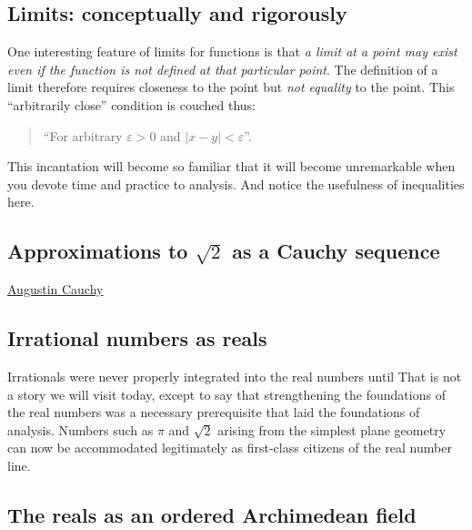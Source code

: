 \documentclass[
  a4paper,
]{article}
\begin{document}
\subsection{Limits: conceptually and
rigorously}\label{limits-conceptually-and-rigorously}

One interesting feature of limits for functions is that \emph{a limit at
a point may exist even if the function is not defined at that particular
point}. The definition of a limit therefore requires closeness to the
point but \emph{not equality} to the point. This ``arbitrarily close''
condition is couched thus:

\begin{quote}
``For arbitrary \(\varepsilon > 0\) and \(| x - y | < \varepsilon\)''.
\end{quote}

This incantation will become so familiar that it will become
unremarkable when you devote time and practice to analysis. And notice
the usefulness of inequalities here.

\subsection{\texorpdfstring{Approximations to \(\sqrt{2}\) as a Cauchy
sequence}{Approximations to \textbackslash sqrt\{2\} as a Cauchy sequence}}\label{approximations-to-sqrt2-as-a-cauchy-sequence}

\href{https://en.wikipedia.org/wiki/Augustin-Louis_Cauchy}{Augustin
Cauchy}

\subsection{Irrational numbers as
reals}\label{irrational-numbers-as-reals}

Irrationals were never properly integrated into the real numbers until
That is not a story we will visit today, except to say that
strengthening the foundations of the real numbers was a necessary
prerequisite that laid the foundations of analysis. Numbers such as
\(\pi\) and \(\sqrt{2}\) arising from the simplest plane geometry can
now be accommodated legitimately as first-class citizens of the real
number line.

\subsection{The reals as an ordered Archimedean
field}\label{the-reals-as-an-ordered-archimedean-field}
\end{document}
